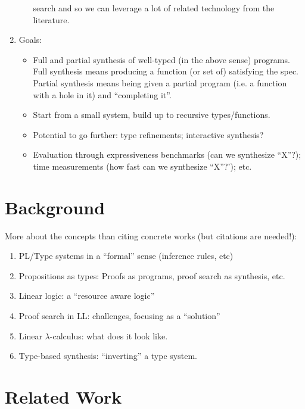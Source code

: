 \documentclass{llncs}
\begin{document}
\begin{enumerate}
\begin{itemize}
    search and so we can leverage a lot of related technology from the
    literature.
  \end{itemize}
\item Goals:
  \begin{itemize}
\item Full and partial synthesis of well-typed (in the above sense)
  programs. Full synthesis means producing a function (or set of)
  satisfying the spec. Partial synthesis means being given a partial
  program (i.e. a function with a hole in it) and ``completing it''.
\item Start from a small system, build up to recursive
  types/functions.
\item Potential to go further: type refinements; interactive
  synthesis?
 \item Evaluation through expressiveness benchmarks (can we synthesize
   ``X''?); time measurements (how fast can we synthesize ``X''?');
   etc.
  \end{itemize}
   
\end{enumerate}

\section{Background}

More about the concepts than citing concrete works (but citations are
needed!):
\begin{enumerate}
\item PL/Type systems in a ``formal'' sense (inference rules, etc)
\item Propositions as types: Proofs as programs, proof search as
  synthesis, etc.
\item Linear logic: a ``resource aware logic''
\item Proof search in LL: challenges, focusing as a ``solution''
\item Linear $\lambda$-calculus: what does it look like.
\item Type-based synthesis: ``inverting'' a type system.
\end{enumerate}

\section{Related Work}
\end{document}
